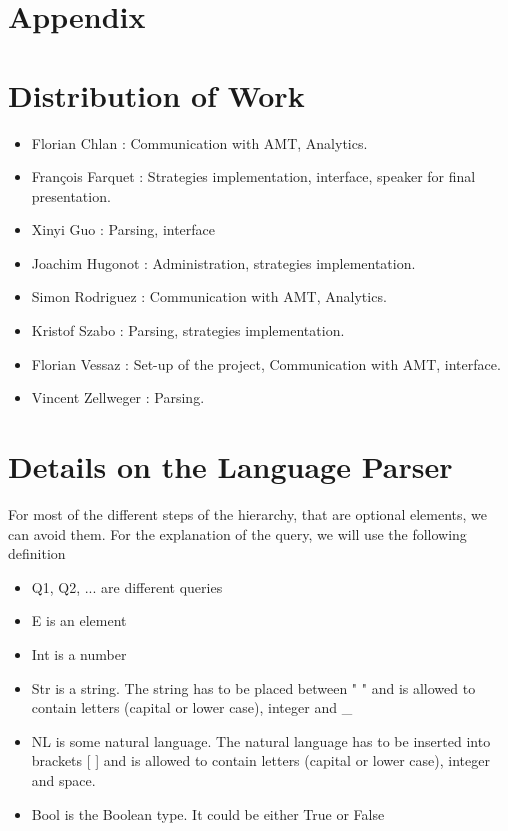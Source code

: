 \documentclass{article}
\begin{document}
\newpage
\appendix
\section*{Appendix}
\section{Distribution of Work}\label{distr}
\begin{itemize}
\item Florian Chlan : Communication with AMT, Analytics.
\item François Farquet : Strategies implementation, interface, speaker for final presentation.
\item Xinyi Guo : Parsing, interface
\item Joachim Hugonot : Administration, strategies implementation.
\item Simon Rodriguez : Communication with AMT, Analytics.
\item Kristof Szabo : Parsing, strategies implementation. 
\item Florian Vessaz : Set-up of the project, Communication with AMT, interface.
\item Vincent Zellweger : Parsing.
\end{itemize}

\section{Details on the Language Parser}\label{parse}

For most of the different steps of the hierarchy, that are optional elements, we can avoid them. %
For the explanation of the query, we will use the following definition
\begin{itemize}
\item Q1, Q2, ... are different queries
\item E is an element
\item Int is a number
\item Str is a string. The string has to be placed between " " and is allowed to contain letters (capital or lower case), integer and \_
\item NL is some natural language. The natural language has to be inserted into brackets [ ] and is allowed to contain letters (capital or lower case), integer and space.
\item Bool is the Boolean type. It could be either True or False
\end{itemize}
\end{document}
